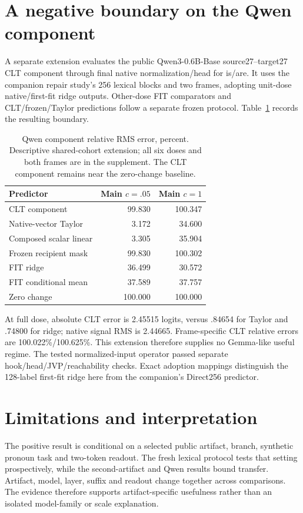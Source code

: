\documentclass[11pt]{article}
\begin{document}
\section{A negative boundary on the Qwen component}
A separate extension evaluates the public Qwen3-0.6B-Base source27--target27 CLT component through final native normalization/head for is/are. It uses the companion repair study's 256 lexical blocks and two frames, adopting unit-dose native/first-fit ridge outputs. Other-dose FIT comparators and CLT/frozen/Taylor predictions follow a separate frozen protocol. Table~\ref{tab:qwen} records the resulting boundary.

\begin{table}[ht]\centering\small
\begin{tabular}{lrr}\toprule Predictor & Main $c=.05$ & Main $c=1$\\\midrule
CLT component & 99.830 & 100.347\\
Native-vector Taylor & 3.172 & 34.600\\
Composed scalar linear & 3.305 & 35.904\\
Frozen recipient mask & 99.830 & 100.302\\
FIT ridge & 36.499 & 30.572\\
FIT conditional mean & 37.589 & 37.757\\
Zero change & 100.000 & 100.000\\\bottomrule\end{tabular}
\caption{Qwen component relative RMS error, percent. Descriptive shared-cohort extension; all six doses and both frames are in the supplement. The CLT component remains near the zero-change baseline.}\label{tab:qwen}
\end{table}

At full dose, absolute CLT error is 2.45515 logits, versus .84654 for Taylor and .74800 for ridge; native signal RMS is 2.44665. Frame-specific CLT relative errors are 100.022\%/100.625\%. This extension therefore supplies no Gemma-like useful regime. The tested normalized-input operator passed separate hook/head/JVP/reachability checks. Exact adoption mappings distinguish the 128-label first-fit ridge here from the companion's Direct256 predictor.

\section{Limitations and interpretation}
The positive result is conditional on a selected public artifact, branch, synthetic pronoun task and two-token readout. The fresh lexical protocol tests that setting prospectively, while the second-artifact and Qwen results bound transfer. Artifact, model, layer, suffix and readout change together across comparisons. The evidence therefore supports artifact-specific usefulness rather than an isolated model-family or scale explanation.
\end{document}
